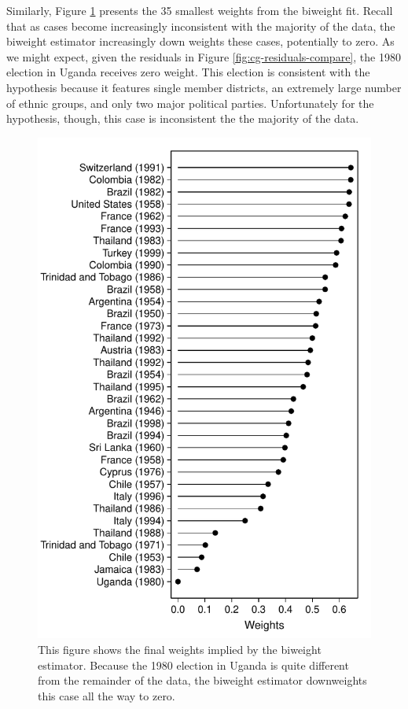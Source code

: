 \documentclass[12pt]{article}
\begin{document}
Similarly, Figure \ref{fig:cg-weights} presents the 35 smallest weights from the biweight fit. 
Recall that as cases become increasingly inconsistent with the majority of the data, the biweight estimator increasingly down weights these cases, potentially to zero. 
As we might expect, given the residuals in Figure \ref{fig:cg-residuals-compare}, the 1980 election in Uganda receives zero weight. 
This election is consistent with the hypothesis because it features single member districts, an extremely large number of ethnic groups, and only two major political parties. 
Unfortunately for the hypothesis, though, this case is inconsistent the the majority of the data.

\begin{figure}[h!]
\begin{center}
\includegraphics[scale = 0.7]{figs/cg-weights.pdf}
\caption{This figure shows the final weights implied by the biweight estimator. 
Because the 1980 election in Uganda is quite different from the remainder of the data, the biweight estimator downweights this case all the way to zero.}\label{fig:cg-weights}
\end{center}
\end{figure}
\end{document}
